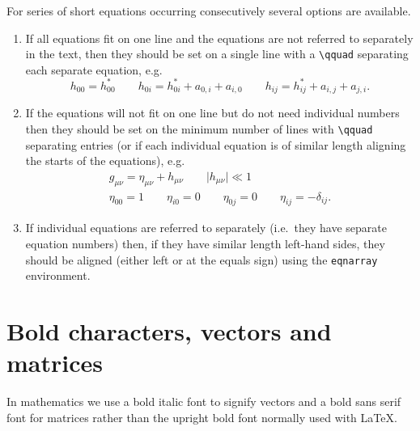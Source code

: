 For series of short equations occurring consecutively several options 
are available. 
\begin{enumerate}
\item If all equations fit on one line and the equations 
are not referred to separately in the text, 
then they should be set on a single 
line with a \verb"\qquad" separating each separate equation, e.g.
\begin{equation}
h_{00}=h^*_{00}\qquad h_{0i}=h^*_{0i}+a_{0,i}+a_{i,0}
\qquad h_{ij}=h^*_{ij}+a_{i,j}+a_{j,i}. \label{eq:hxy}
\end{equation}

\item If the equations will not fit on one line but do not need 
individual numbers then they should be set on the minimum number of 
lines with \verb"\qquad" separating entries (or if each individual 
equation is of similar length aligning the starts of the equations), 
e.g.
\begin{eqnarray*}
&g_{\mu\nu}=\eta_{\mu\nu}+h_{\mu\nu}\qquad
\vert h_{\mu\nu}\vert \ll 1&\\
&\eta_{00}=1\qquad \eta_{i0}=0\qquad \eta_{0j}=0 
\qquad \eta_{ij}= -\delta_{ij}.&
\end{eqnarray*}


\item If individual equations are referred to separately (i.e.\ they 
have separate equation numbers) then, if they have similar length 
left-hand sides, they should be aligned (either left or at the equals 
sign) using the \verb"eqnarray" environment.
\end{enumerate}

\section{Bold characters, vectors and matrices}
In mathematics we use a bold italic 
font to signify vectors and a bold sans serif font for matrices 
rather than 
the upright bold font normally used with \LaTeX. 

